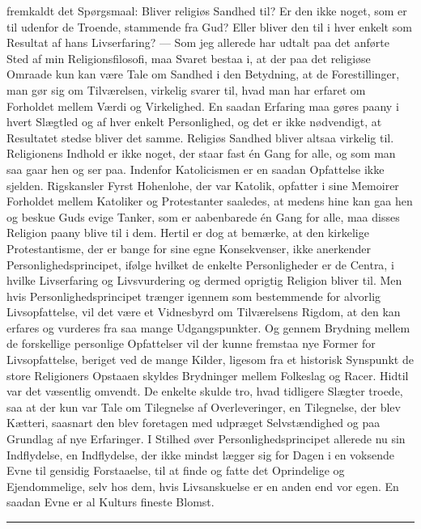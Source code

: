 \documentclass[12pt]{article}
\newcommand{\apage}[1]{\marginnote{\footnotesize\textit{[#1]}}}
\begin{document}
       fremkaldt det Spørgsmaal: Bliver religiøs Sandhed til? Er den ikke
noget, som er til udenfor de Troende, stammende fra Gud? Eller bliver den til i
hver enkelt som Resultat af hans Livserfaring? --- Som jeg allerede har udtalt
paa det anførte Sted af min Religionsfilosofi, maa Svaret bestaa i, at der paa
det religiøse Omraade kun kan være Tale om Sandhed i den Betydning, at de
Forestillinger, man gør sig om Tilværelsen, virkelig svarer til, hvad man har
erfaret om Forholdet mellem Værdi og Virkelighed. En saadan Erfaring maa gøres
paany i hvert Slægtled og af hver enkelt Personlighed, og det er ikke
nødvendigt, at Resultatet stedse bliver det samme. Religiøs Sandhed bliver
altsaa virkelig til. Religionens Indhold er ikke noget, der staar fast én Gang
for alle, og som man saa gaar hen og ser paa. Indenfor Katolicismen er en
saadan Opfattelse ikke sjelden. Rigskansler Fyrst Hohenlohe, der var Katolik,
opfatter i sine Memoirer Forholdet mellem Katoliker og Protestanter saaledes,
at medens hine kan gaa hen og beskue Guds evige Tanker, som er aabenbarede én
Gang for alle, maa disses Religion paany blive til i dem. Hertil er dog at
bemærke, at den kirkelige Protestantisme, der er bange for sine egne
Konsekvenser, ikke anerkender Personlighedsprincipet, ifølge hvilket de enkelte
Personligheder er de Centra, i hvilke Livserfaring og Livsvurdering og dermed
oprigtig Religion bliver til. Men hvis Personlighedsprincipet trænger igennem
som bestemmende for alvorlig Livsopfattelse,
\setcounter{footnote}{0}%
\apage{115}vil det være et Vidnesbyrd om Tilværelsens Rigdom, at den kan
erfares og vurderes fra saa mange Udgangspunkter. Og gennem Brydning mellem de
forskellige personlige Opfattelser vil der kunne fremstaa nye Former for
Livsopfattelse, beriget ved de mange Kilder, ligesom fra et historisk Synspunkt
de store Religioners Opstaaen skyldes Brydninger mellem Folkeslag og Racer.
Hidtil var det væsentlig omvendt. De enkelte skulde tro, hvad tidligere Slægter
troede, saa at der kun var Tale om Tilegnelse af Overleveringer, en Tilegnelse,
der blev Kætteri, saasnart den blev foretagen med udpræget Selvstændighed og
paa Grundlag af nye Erfaringer. I Stilhed øver Personlighedsprincipet allerede
nu sin Indflydelse, en Indflydelse, der ikke mindst lægger sig for Dagen i en
voksende Evne til gensidig Forstaaelse, til at finde og fatte det Oprindelige
og Ejendommelige, selv hos dem, hvis Livsanskuelse er en anden end vor egen. En
saadan Evne er al Kulturs fineste Blomst.

\begin{center}\rule{3em}{0.4pt}\end{center}
\end{document}
